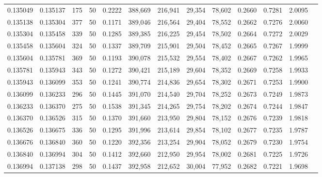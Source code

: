 \begin{tabular}{rrrrrrrrrrrrr}
0.135049 & 0.135137 &   175 &  50 &                                     0.2222 & 388,669 & 216,941 &  29,354 &  78,602 & 0.2660 & 0.7281 & 2.0095 \\
0.135138 & 0.135304 &   377 &  50 &                                     0.1171 & 389,046 & 216,564 &  29,404 &  78,552 & 0.2662 & 0.7276 & 2.0060 \\
0.135304 & 0.135458 &   339 &  50 &                                     0.1285 & 389,385 & 216,225 &  29,454 &  78,502 & 0.2664 & 0.7272 & 2.0029 \\
0.135458 & 0.135604 &   324 &  50 &                                     0.1337 & 389,709 & 215,901 &  29,504 &  78,452 & 0.2665 & 0.7267 & 1.9999 \\
0.135604 & 0.135781 &   369 &  50 &                                     0.1193 & 390,078 & 215,532 &  29,554 &  78,402 & 0.2667 & 0.7262 & 1.9965 \\
0.135781 & 0.135943 &   343 &  50 &                                     0.1272 & 390,421 & 215,189 &  29,604 &  78,352 & 0.2669 & 0.7258 & 1.9933 \\
0.135943 & 0.136099 &   353 &  50 &                                     0.1241 & 390,774 & 214,836 &  29,654 &  78,302 & 0.2671 & 0.7253 & 1.9900 \\
0.136099 & 0.136233 &   296 &  50 &                                     0.1445 & 391,070 & 214,540 &  29,704 &  78,252 & 0.2673 & 0.7249 & 1.9873 \\
0.136233 & 0.136370 &   275 &  50 &                                     0.1538 & 391,345 & 214,265 &  29,754 &  78,202 & 0.2674 & 0.7244 & 1.9847 \\
0.136370 & 0.136526 &   315 &  50 &                                     0.1370 & 391,660 & 213,950 &  29,804 &  78,152 & 0.2676 & 0.7239 & 1.9818 \\
0.136526 & 0.136675 &   336 &  50 &                                     0.1295 & 391,996 & 213,614 &  29,854 &  78,102 & 0.2677 & 0.7235 & 1.9787 \\
0.136676 & 0.136840 &   360 &  50 &                                     0.1220 & 392,356 & 213,254 &  29,904 &  78,052 & 0.2679 & 0.7230 & 1.9754 \\
0.136840 & 0.136994 &   304 &  50 &                                     0.1412 & 392,660 & 212,950 &  29,954 &  78,002 & 0.2681 & 0.7225 & 1.9726 \\
0.136994 & 0.137138 &   298 &  50 &                                     0.1437 & 392,958 & 212,652 &  30,004 &  77,952 & 0.2682 & 0.7221 & 1.9698 \\

\end{tabular}
